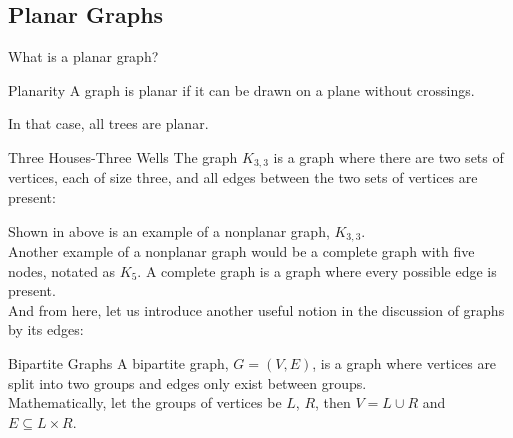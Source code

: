 \subsection{Planar Graphs}
What is a planar graph?
\begin{ln-define}{Planarity}{}
    A graph is planar if it can be drawn on a plane without crossings.
\end{ln-define}
In that case, all trees are planar. \\
\begin{ln-symbol}{Three Houses-Three Wells}{}
    The graph $K_{3,3}$ is a graph where there are two sets of vertices, each of size three, and all edges between the two sets of vertices are present:
    \begin{center}
    \end{center}
\end{ln-symbol}
Shown in above is an example of a nonplanar graph, $K_{3,3}$. \\
Another example of a nonplanar graph would be a complete graph with five nodes, notated as $K_5$. A complete graph is a graph where every possible edge is present. \\
And from here, let us introduce another useful notion in the discussion of graphs by its edges:
\begin{ln-define}{Bipartite Graphs}{}
    A bipartite graph, $G = (V, E)$, is a graph where vertices are split into two groups and edges only exist between groups. \\
    Mathematically, let the groups of vertices be $L$, $R$, then $V = L \cup R$ and $E \subseteq L \times R$.
\end{ln-define}

